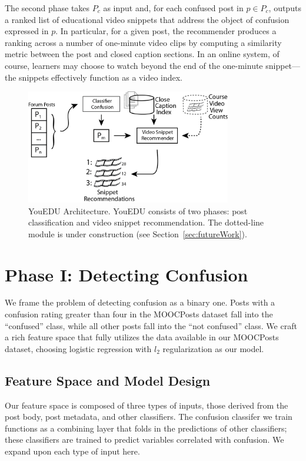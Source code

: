 \documentclass{edm_template}
\begin{document}
The second phase takes $P_{c}$ as input and, for each confused post in $p \in P_{c}$, outputs a ranked list of educational video snippets that address the object of confusion expressed in $p$. In particular, for a given post, the recommender produces a ranking across a number of one-minute video clips by computing a similarity metric between the post and closed caption sections. In an online system, of course, learners may choose to watch beyond the end of the one-minute snippet---the snippets effectively function as a video index.
\begin{figure}[htp]
       \centering
       \includegraphics[width=0.8\textwidth]{../Figs/youEduArch.png}
       \caption{\textnormal{YouEDU Architecture. YouEDU 
           consists of two phases: post classification and video
           snippet recommendation. The dotted-line module is under
           construction (see Section~\ref{sec:futureWork}).}}
       \label{figure:architecture}
\end{figure}

\section{Phase I: Detecting Confusion}
\label{sec:confusionDetection}

We frame the problem of detecting confusion as a binary one. Posts with a confusion rating greater than four in the MOOCPosts dataset fall into the ``confused'' class, while all other posts fall into the ``not confused'' class. We craft a rich feature space that fully utilizes the data available in our MOOCPosts dataset, choosing logistic regression with $l_{2}$ regularization as our model.

\subsection{Feature Space and Model Design}
Our feature space is composed of three types of inputs, those derived from the post body, post metadata, and other classifiers. The confusion classifer we train functions as a combining layer that folds in the predictions of other classifiers; these classifiers are trained to predict variables correlated with confusion. We expand upon each type of input here.
\end{document}
